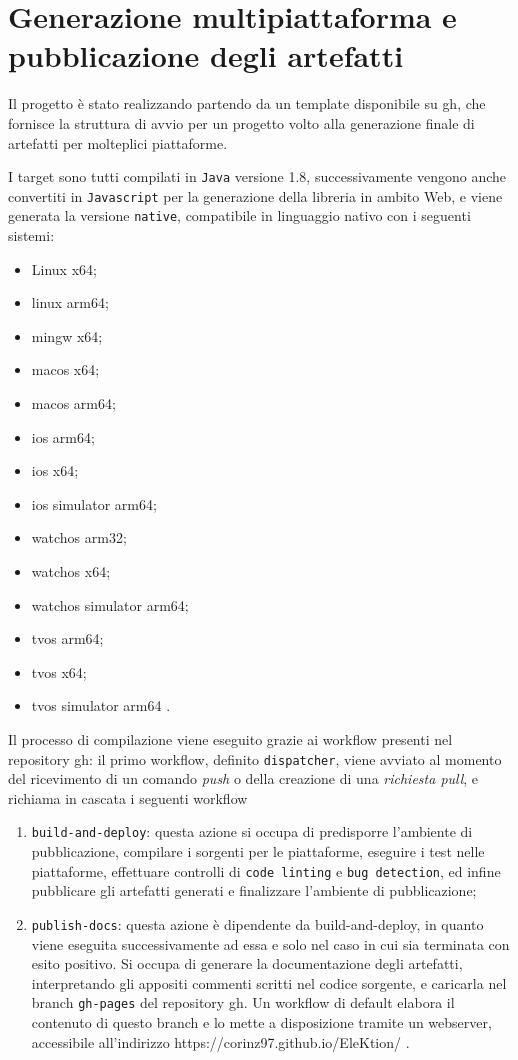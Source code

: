 \documentclass[12pt,a4paper,openright,twoside]{book}
\begin{document}
\section{Generazione multipiattaforma e pubblicazione degli artefatti}

Il progetto è stato realizzando partendo da un template \cite{WebsiteTemplateKotlinMP} disponibile su \ac{gh}, che fornisce 
la struttura di avvio per un progetto volto alla generazione finale di artefatti per molteplici piattaforme.

I target sono tutti compilati in \texttt{Java} versione 1.8, successivamente vengono anche convertiti in \texttt{Javascript} per la generazione della
libreria in ambito Web, e viene generata la versione \texttt{native}, compatibile in linguaggio nativo con i seguenti sistemi:
\begin{itemize}
    \label{list:elencotargetgenerati}
    \item{Linux x64;}
    \item{linux arm64;}
    \item{mingw x64;}
    \item{macos x64;}
    \item{macos arm64;}
    \item{ios arm64;}
    \item{ios x64;}
    \item{ios simulator arm64;}
    \item{watchos arm32;}
    \item{watchos x64;}
    \item{watchos simulator arm64;}
    \item{tvos arm64;}
    \item{tvos x64;}
    \item{tvos simulator arm64 .}
\end{itemize}

Il processo di compilazione viene eseguito grazie ai workflow presenti nel repository \ac{gh}:
il primo workflow, definito \texttt{dispatcher}, viene avviato al momento del ricevimento di un comando \textit{push} o della creazione di
una \textit{richiesta pull}, e richiama in cascata i seguenti workflow
\begin{enumerate}
\item{\texttt{build-and-deploy}: questa azione si occupa di predisporre l'ambiente di pubblicazione, compilare i sorgenti per le piattaforme, eseguire
i test nelle piattaforme, effettuare controlli di \texttt{code linting} e \texttt{bug detection}, ed infine pubblicare gli artefatti generati e finalizzare
l'ambiente di pubblicazione;}
\item{\texttt{publish-docs}: questa azione è dipendente da build-and-deploy, in quanto viene eseguita successivamente ad essa e solo nel caso in cui 
sia terminata con esito positivo. Si occupa di generare la documentazione degli artefatti, interpretando gli appositi commenti scritti nel codice sorgente,
e caricarla nel branch \texttt{gh-pages} del repository \ac{gh}. Un workflow di default elabora il contenuto di questo branch e lo mette a 
disposizione tramite un webserver, accessibile all'indirizzo https://corinz97.github.io/EleKtion/ .}
\end{enumerate}
\end{document}

